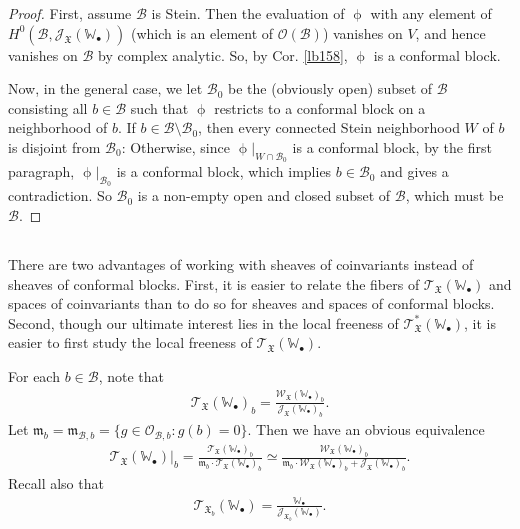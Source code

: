 \documentclass[12pt,a4paper,notitlepage]{article}
\theoremstyle{definition}
\theoremstyle{plain}
\newcommand{\fk}{\mathfrak}
\newcommand{\mc}{\mathcal}
\newcommand{\scr}{\mathscr}
\newcommand{\blt}{\bullet}
\newcommand{\Wbb}{\mathbb W}
\numberwithin{equation}{section}
\begin{document}
\begin{proof}
First, assume $\mc B$ is Stein. Then the evaluation of $\upphi$ with any element of $H^0(\mc B,\scr J_{\fk X}(\Wbb_\blt))$ (which is an element of $\scr O(\mc B)$) vanishes on $V$, and hence vanishes on $\mc B$ by complex analytic. So, by Cor. \ref{lb158}, $\upphi$ is a conformal block.

Now, in the general case, we let $\mc B_0$ be the (obviously open) subset of $\mc B$ consisting all $b\in\mc B$ such that $\upphi$ restricts to a conformal block on a neighborhood of $b$. If $b\in\mc B\setminus\mc B_0$, then  every connected Stein neighborhood $W$ of $b$ is disjoint from $\mc B_0$: Otherwise, since $\upphi|_{W\cap\mc B_0}$ is a conformal block, by the first paragraph, $\upphi|_{\mc B_0}$ is a conformal block, which implies $b\in\mc B_0$ and gives a contradiction. So $\mc B_0$ is a non-empty open and closed subset of $\mc B$, which must be $\mc B$. 
\end{proof}






\subsection{}



There are two advantages of working with sheaves of coinvariants instead of sheaves of conformal blocks. First, it is easier to relate the fibers of $\scr T_{\fk X}(\Wbb_\blt)$ and spaces of coinvariants than to do so for sheaves and spaces of conformal blocks. Second, though our ultimate interest lies in  the local freeness of $\scr T_{\fk X}^*(\Wbb_\blt)$, it is easier to first study the local freeness of $\scr T_{\fk X}(\Wbb_\blt)$.

For each $b\in\mc B$, note that
\begin{align*}
\scr T_{\fk X}(\Wbb_\blt)_b=\frac{\scr W_{\fk X}(\Wbb_\blt)_b}{\scr J_{\fk X}(\Wbb_\blt)_b}.
\end{align*}
Let $\fk m_b=\fk m_{\mc B,b}=\{g\in\scr O_{\mc B,b}:g(b)=0\}$. Then we have an obvious equivalence
\begin{align}
\scr T_{\fk X}(\Wbb_\blt)\big|_b=\frac{\scr T_{\fk X}(\Wbb_\blt)_b}{\fk m_b\cdot \scr T_{\fk X}(\Wbb_\blt)_b}\simeq \frac{\scr W_{\fk X}(\Wbb_\blt)_b}{\fk m_b\cdot \scr W_{\fk X}(\Wbb_\blt)_b+ \scr J_{\fk X}(\Wbb_\blt)_b}.
\end{align}
Recall also that
\begin{align}
\scr T_{\fk X_b}(\Wbb_\blt)=\frac{\Wbb_\blt}{\scr J_{\fk X_b}(\Wbb_\blt)}.
\end{align}
\end{document}
